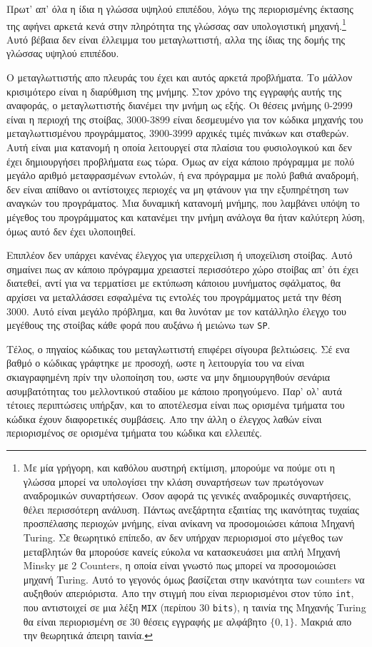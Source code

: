 \documentclass[a4paper,11pt]{article}
\newcommand{\eng}[1]{\foreignlanguage{english}{#1}}
\newcommand{\tech}[1]{\foreignlanguage{english}{\texttt{#1}}}
\begin{document}
Πρωτ' απ' όλα η ίδια η γλώσσα υψηλού επιπέδου, λόγω της περιορισμένης έκτασης της αφήνει
αρκετά κενά στην πληρότητα της γλώσσας σαν υπολογιστική μηχανή.\footnote{
	Με μία γρήγορη, και καθόλου αυστηρή εκτίμιση, μπορούμε να πούμε οτι η γλώσσα μπορεί
	να υπολογίσει την κλάση συναρτήσεων των πρωτόγονων αναδρομικών συναρτήσεων. Όσον 
	αφορά τις γενικές αναδρομικές συναρτήσεις, θέλει περισσότερη ανάλυση. Πάντως ανεξάρτητα
	εξαιτίας της ικανότητας τυχαίας προσπέλασης περιοχών μνήμης, είναι ανίκανη να προσομοιώσει
	κάποια Μηχανή \eng{Turing}. Σε θεωρητικό επίπεδο, αν δεν υπήρχαν περιορισμοί στο μέγεθος
	των μεταβλητών θα μπορούσε κανείς εύκολα να κατασκευάσει μια απλή Μηχανή \eng{Minsky} με 
	2 \eng{Counters}, η οποία είναι γνωστό πως μπορεί να προσομοιώσει μηχανή \eng{Turing}.
	Αυτό το γεγονός όμως βασίζεται στην ικανότητα των \eng{counters} να αυξηθούν απεριόριστα.
	Απο την στιγμή που είναι περιορισμένοι στον τύπο \tech{int}, που αντιστοιχεί σε μια
	λέξη \tech{MIX} (περίπου \(30\) \tech{bits}), η ταινία της Μηχανής \eng{Turing} θα είναι
	περιορισμένη σε \(30\) θέσεις εγγραφής με αλφάβητο \(\{0,1\}\). Μακριά απο την θεωρητικά
	άπειρη ταινία.
} Αυτό βέβαια δεν είναι έλλειμμα του μεταγλωττιστή, αλλα της ίδιας της δομής της γλώσσας 
υψηλού επιπέδου.

Ο μεταγλωττιστής απο πλευράς του έχει και αυτός αρκετά προβλήματα. Το μάλλον κρισιμότερο
είναι η διαρύθμιση της μνήμης. Στον χρόνο της εγγραφής αυτής της αναφοράς, ο μεταγλωττιστής
διανέμει την μνήμη ως εξής. Οι θέσεις μνήμης 0-2999 είναι η περιοχή της στοίβας, 3000-3899
είναι δεσμευμένο για τον κώδικα μηχανής του μεταγλωττισμένου προγράμματος, 3900-3999 
αρχικές τιμές πινάκων και σταθερών. Αυτή είναι μια κατανομή η οποία λειτουργεί στα πλαίσια
του φυσιολογικού και δεν έχει δημιουργήσει προβλήματα εως τώρα. Όμως αν είχα κάποιο πρόγραμμα
με πολύ μεγάλο αριθμό μεταφρασμένων εντολών, ή ενα πρόγραμμα με πολύ βαθιά αναδρομή, δεν είναι
απίθανο οι αντίστοιχες περιοχές να μη φτάνουν για την εξυπηρέτηση των αναγκών του προγράματος.
Μια δυναμική κατανομή μνήμης, που λαμβάνει υπόψη το μέγεθος του προγράμματος και κατανέμει
την μνήμη ανάλογα θα ήταν καλύτερη λύση, όμως αυτό δεν έχει υλοποιηθεί.

Επιπλέον δεν υπάρχει κανένας έλεγχος για υπερχείλιση ή υποχείλιση στοίβας. Αυτό σημαίνει
πως αν κάποιο πρόγραμμα χρειαστεί περισσότερο χώρο στοίβας απ' ότι έχει διατεθεί, αντί για
να τερματίσει με εκτύπωση κάποιου μυνήματος σφάλματος, θα αρχίσει να μεταλλάσσει εσφαλμένα 
τις εντολές του προγράμματος μετά την θέση 3000. Αυτό είναι μεγάλο πρόβλημα, και θα λυνόταν
με τον κατάλληλο έλεγχο του μεγέθους της στοίβας κάθε φορά που αυξάνω ή μειώνω των \tech{SP}.

Τέλος, ο πηγαίος κώδικας του μεταγλωττιστή επιφέρει σίγουρα βελτιώσεις. Σέ ενα βαθμό
ο κώδικας γράφτηκε με προσοχή, ωστε η λειτουργία του να είναι σκιαγραφημένη πρίν την 
υλοποίηση του, ωστε να μην δημιουργηθούν σενάρια ασυμβατότητας του μελλοντικού σταδίου
με κάποιο προηγούμενο. Παρ' ολ' αυτά τέτοιες περιπτώσεις υπήρξαν, και το αποτέλεσμα
είναι πως ορισμένα τμήματα του κώδικα έχουν διαφορετικές συμβάσεις. Απο την άλλη ο έλεγχος
λαθών είναι περιορισμένος σε ορισμένα τμήματα του κώδικα και ελλειπές. 
\end{document}
